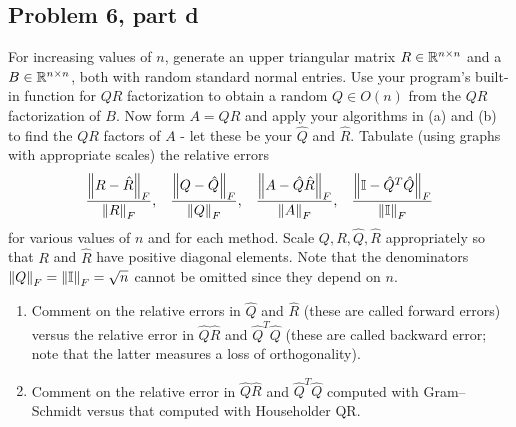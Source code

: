 \subsection{Problem 6, part d}
For increasing values of $n$, generate an upper triangular matrix $R\in \mathbb{R}^{n\times n}$ and a $B \in \mathbb{R}^{n\times n}$, both with random standard normal entries. Use your program's built-in function for $QR$ factorization to obtain a random $Q\in O(n)$ from the $QR$ factorization of $B$. Now form $A = QR$ and apply your algorithms in (a) and (b) to find the $QR$ factors of $A$ - let these be your $\hat{Q}$ and $\hat{R}$. Tabulate (using graphs with appropriate scales) the relative errors
\[
\frac{\norm{R - \hat{R}}_F}{\norm{R}_F}, \hspace{3mm} \frac{\norm{Q - \hat{Q}}_F}{\norm{Q}_F}, \hspace{3mm} \frac{\norm{A - \hat{Q}\hat{R}}_F}{\norm{A}_F}, \hspace{3mm} \frac{\norm{\mathbb{I} - \hat{Q}^T\hat{Q}}_F}{\norm{\mathbb{I}}_F} 
\]
for various values of $n$ and for each method. Scale $Q, R, \hat{Q}, \hat{R}$ appropriately so that $R$ and $\hat{R}$ have positive diagonal elements. Note that the denominators $\norm{Q}_F = \norm{\mathbb{I}}_F = \sqrt{n}$ cannot be omitted since they depend on $n$.
\begin{enumerate}
    \item Comment on the relative errors in $\hat{Q}$ and $\hat{R}$ (these are called forward errors) versus the relative error in $\hat{Q}\hat{R}$ and $\hat{Q}^T\hat{Q}$ (these are called backward error; note that the latter measures a loss of orthogonality).

    \item Comment on the relative error in $\hat{Q}\hat{R}$ and $\hat{Q}^T\hat{Q}$ computed with Gram–Schmidt versus that computed with Householder QR.
\end{enumerate}

